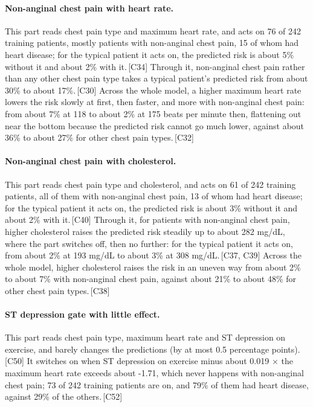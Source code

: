 \documentclass[a4paper,10pt]{article}
\newif\ifreviewmarks
\newcommand{\reviewrule}{\noindent{\color{BrickRed}\rule{\linewidth}{0.8pt}}}
\newenvironment{drafted}[1][]{%
  \ifreviewmarks\par\addvspace{\medskipamount}\reviewrule\par\nopagebreak
  \noindent{\color{BrickRed}\sffamily\footnotesize\textbf{Thesis Draft}\quad #1\hfill review}\par\nopagebreak\smallskip\fi}{%
  \ifreviewmarks\par\smallskip\noindent{\color{BrickRed}\sffamily\footnotesize end of thesis draft}\par\nopagebreak\reviewrule\par\medskip\fi}
\begin{document}
\begin{drafted}[plain-language layer: heart-s2-c3]
\paragraph{Non-anginal chest pain with heart rate.} This part reads chest pain type and maximum heart rate, and acts on 76 of 242 training patients, mostly patients with non-anginal chest pain, 15 of whom had heart disease; for the typical patient it acts on, the predicted risk is about 5\% without it and about 2\% with it.\,{\scriptsize\textcolor{NavyBlue}{[C34]}} Through it, non-anginal chest pain rather than any other chest pain type takes a typical patient's predicted risk from about 30\% to about 17\%.\,{\scriptsize\textcolor{NavyBlue}{[C30]}} Across the whole model, a higher maximum heart rate lowers the risk slowly at first, then faster, and more with non-anginal chest pain: from about 7\% at 118 to about 2\% at 175 beats per minute then, flattening out near the bottom because the predicted risk cannot go much lower, against about 36\% to about 27\% for other chest pain types.\,{\scriptsize\textcolor{NavyBlue}{[C32]}}
\paragraph{Non-anginal chest pain with cholesterol.} This part reads chest pain type and cholesterol, and acts on 61 of 242 training patients, all of them with non-anginal chest pain, 13 of whom had heart disease; for the typical patient it acts on, the predicted risk is about 3\% without it and about 2\% with it.\,{\scriptsize\textcolor{NavyBlue}{[C40]}} Through it, for patients with non-anginal chest pain, higher cholesterol raises the predicted risk steadily up to about 282 mg/dL, where the part switches off, then no further: for the typical patient it acts on, from about 2\% at 193 mg/dL to about 3\% at 308 mg/dL.\,{\scriptsize\textcolor{NavyBlue}{[C37, C39]}} Across the whole model, higher cholesterol raises the risk in an uneven way from about 2\% to about 7\% with non-anginal chest pain, against about 21\% to about 48\% for other chest pain types.\,{\scriptsize\textcolor{NavyBlue}{[C38]}}
\paragraph{ST depression gate with little effect.} This part reads chest pain type, maximum heart rate and ST depression on exercise, and barely changes the predictions (by at most 0.5 percentage points).\,{\scriptsize\textcolor{NavyBlue}{[C50]}} It switches on when ST depression on exercise minus about 0.019 $\times$ the maximum heart rate exceeds about -1.71, which never happens with non-anginal chest pain; 73 of 242 training patients are on, and 79\% of them had heart disease, against 29\% of the others.\,{\scriptsize\textcolor{NavyBlue}{[C52]}}

\end{drafted}
\end{document}
